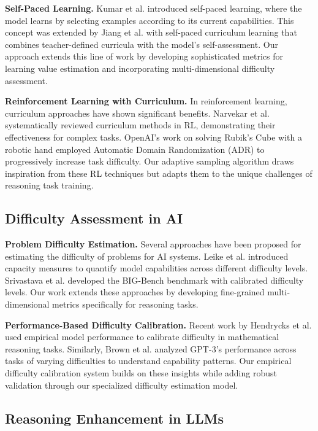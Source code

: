 \textbf{Self-Paced Learning.} Kumar et al. \citep{kumar2010self} introduced self-paced learning, where the model learns by selecting examples according to its current capabilities. This concept was extended by Jiang et al. \citep{jiang2015self} with self-paced curriculum learning that combines teacher-defined curricula with the model's self-assessment. Our approach extends this line of work by developing sophisticated metrics for learning value estimation and incorporating multi-dimensional difficulty assessment.

\textbf{Reinforcement Learning with Curriculum.} In reinforcement learning, curriculum approaches have shown significant benefits. Narvekar et al. \citep{narvekar2020curriculum} systematically reviewed curriculum methods in RL, demonstrating their effectiveness for complex tasks. OpenAI's work on solving Rubik's Cube with a robotic hand \citep{akkaya2019solving} employed Automatic Domain Randomization (ADR) to progressively increase task difficulty. Our adaptive sampling algorithm draws inspiration from these RL techniques but adapts them to the unique challenges of reasoning task training.

\subsection{Difficulty Assessment in AI}

\textbf{Problem Difficulty Estimation.} Several approaches have been proposed for estimating the difficulty of problems for AI systems. Leike et al. \citep{leike2022capacity} introduced capacity measures to quantify model capabilities across different difficulty levels. Srivastava et al. \citep{srivastava2022beyond} developed the BIG-Bench benchmark with calibrated difficulty levels. Our work extends these approaches by developing fine-grained multi-dimensional metrics specifically for reasoning tasks.

\textbf{Performance-Based Difficulty Calibration.} Recent work by Hendrycks et al. \citep{hendrycks2021measuring} used empirical model performance to calibrate difficulty in mathematical reasoning tasks. Similarly, Brown et al. \citep{brown2020language} analyzed GPT-3's performance across tasks of varying difficulties to understand capability patterns. Our empirical difficulty calibration system builds on these insights while adding robust validation through our specialized difficulty estimation model.

\subsection{Reasoning Enhancement in LLMs}

